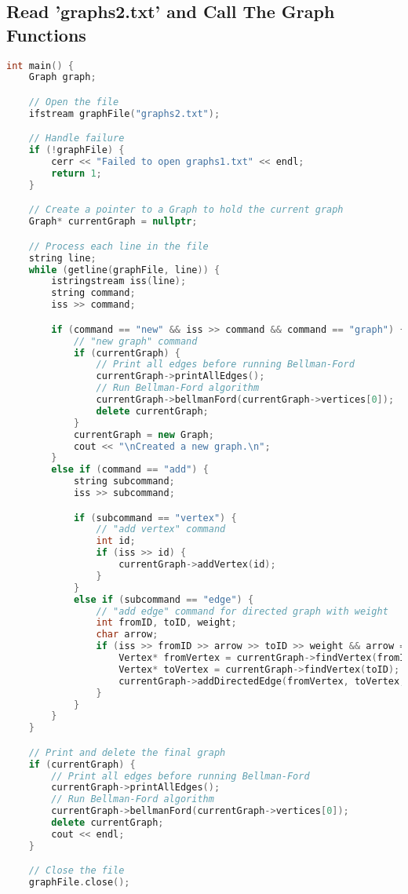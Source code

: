 \documentclass[letterpaper, 10pt,DIV=13]{scrartcl}
\numberwithin{equation}{section} %
\numberwithin{figure}{section} %
\numberwithin{table}{section} %
\begin{document}
\subsection{Read 'graphs2.txt' and Call The Graph Functions}
\begin{linenumbers}
\begin{lstlisting}[language=C++, caption={Read 'graphs2.txt' and Call The Graph Functions}, label={code:example}]
int main() {
    Graph graph;

    // Open the file
    ifstream graphFile("graphs2.txt");

    // Handle failure
    if (!graphFile) {
        cerr << "Failed to open graphs1.txt" << endl;
        return 1;
    }

    // Create a pointer to a Graph to hold the current graph
    Graph* currentGraph = nullptr;

    // Process each line in the file
    string line;
    while (getline(graphFile, line)) {
        istringstream iss(line);
        string command;
        iss >> command;

        if (command == "new" && iss >> command && command == "graph") {
            // "new graph" command
            if (currentGraph) {
                // Print all edges before running Bellman-Ford
                currentGraph->printAllEdges();
                // Run Bellman-Ford algorithm
                currentGraph->bellmanFord(currentGraph->vertices[0]);
                delete currentGraph;
            }
            currentGraph = new Graph;
            cout << "\nCreated a new graph.\n";
        }
        else if (command == "add") {
            string subcommand;
            iss >> subcommand;

            if (subcommand == "vertex") {
                // "add vertex" command
                int id;
                if (iss >> id) {
                    currentGraph->addVertex(id);
                }
            }
            else if (subcommand == "edge") {
                // "add edge" command for directed graph with weight
                int fromID, toID, weight;
                char arrow;
                if (iss >> fromID >> arrow >> toID >> weight && arrow == '-') {
                    Vertex* fromVertex = currentGraph->findVertex(fromID);
                    Vertex* toVertex = currentGraph->findVertex(toID);
                    currentGraph->addDirectedEdge(fromVertex, toVertex, weight);
                }
            }
        }
    }

    // Print and delete the final graph
    if (currentGraph) {
        // Print all edges before running Bellman-Ford
        currentGraph->printAllEdges();
        // Run Bellman-Ford algorithm
        currentGraph->bellmanFord(currentGraph->vertices[0]);
        delete currentGraph;
        cout << endl;
    }

    // Close the file
    graphFile.close();
\end{lstlisting}
\end{linenumbers}
\nolinenumbers
\end{document}
